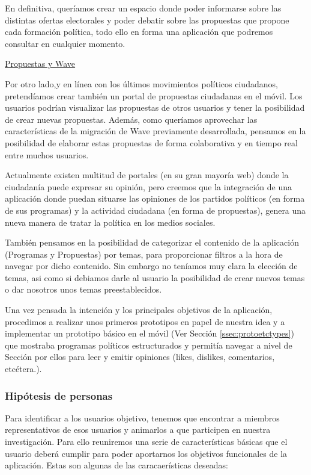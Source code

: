 En definitiva, queríamos crear un espacio donde poder informarse sobre las distintas ofertas electorales y poder debatir sobre las propuestas que propone cada formación política, todo ello en forma una aplicación que podremos consultar en cualquier momento. 

\underline{Propuestas y Wave}

Por otro lado,y en línea con los últimos movimientos políticos ciudadanos, pretendíamos crear también un portal de propuestas ciudadanas en el móvil. Los usuarios podrían visualizar las propuestas de otros usuarios y tener la posibilidad de crear nuevas propuestas. Además, como queríamos aprovechar las características de la migración de Wave previamente desarrollada, pensamos en la posibilidad de elaborar estas propuestas de forma colaborativa y en tiempo real entre muchos usuarios.

Actualmente existen multitud de portales (en su gran mayoría web) donde la ciudadanía puede expresar su opinión, pero creemos que la integración de una aplicación donde puedan situarse las opiniones de los partidos políticos (en forma de sus programas) y la actividad ciudadana (en forma de propuestas), genera una nueva manera de tratar la política en los medios sociales.

También pensamos en la posibilidad de categorizar el contenido de la aplicación (Programas y Propuestas) por temas, para proporcionar filtros a la hora de navegar por dicho contenido. Sin embargo no teníamos muy clara la elección de temas, asi como si debiamos darle al usuario la posibilidad de crear nuevos temas o dar nosotros unos temas preestablecidos.
 
Una vez pensada la intención y los principales objetivos de la aplicación, procedimos a realizar unos primeros prototipos en papel de nuestra idea y a implementar un prototipo básico en el móvil (Ver Sección \ref{ssec:protoetctypes}) que mostraba programas políticos estructurados y permitía navegar a nivel de Sección por ellos para leer y emitir opiniones (likes, dislikes, comentarios, etcétera.).  

\subsubsection{Hipótesis de personas}

Para identificar a los usuarios objetivo, tenemos que encontrar a miembros representativos de esos usuarios y animarlos a que participen en nuestra investigación. Para ello reuniremos una serie de características básicas que el usuario deberá cumplir para poder aportarnos los objetivos funcionales de la aplicación. Estas son algunas de las caracaerísticas deseadas:

